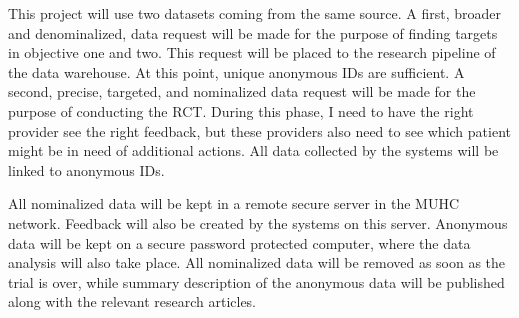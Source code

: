 This project will use two datasets coming from the same source. A first, broader and denominalized, data request will be made for the purpose of finding targets in objective one and two. This request will be placed to the research pipeline of the data warehouse. At this point, unique anonymous IDs are sufficient. A second, precise, targeted, and nominalized data request will be made for the purpose of conducting the RCT. During this phase, I need to have the right provider see the right feedback, but these providers also need to see which patient might be in need of additional actions. All data collected by the systems will be linked to anonymous IDs.

All nominalized data will be kept in a remote secure server in the MUHC network. Feedback will also be created by the systems on this server. Anonymous data will be kept on a secure password protected computer, where the data analysis will also take place. All nominalized data will be removed as soon as the trial is over, while summary description of the anonymous data will be published along with the relevant research articles.


